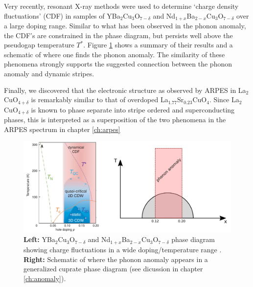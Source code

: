Very recently, resonant X-ray methods were used to determine `charge density fluctuations' (CDF) in samples of YBa$_2$Cu$_3$O$_{7-\delta}$ and Nd$_{1+x}$Ba$_{2-x}$Cu$_3$O$_{7-\delta}$ over a large doping range. Similar to what has been observed in the phonon anomaly, the CDF's are constrained in the phase diagram, but persists well above the pseudogap temperature $T^*$. Figure \ref{fig:cdw_summary} shows a summary of their results and a schematic of where one finds the phonon anomaly. The similarity of these phenomena strongly supports the suggested \cite{Reznik2012} connection between the phonon anomaly and dynamic stripes.

Finally, we discovered that the electronic structure as observed by ARPES in La$_2$CuO$_{4+\delta}$ is remarkably similar to that of overdoped La$_{1.77}$Sr$_{0.23}$CuO$_4$. Since La$_2$CuO$_{4+\delta}$ is known to phase separate into stripe ordered and superconducting phases, this is interpreted as a superposition of the two phenomena in the ARPES spectrum in chapter \ref{ch:arpes}

\begin{figure}
    \centering
    \includegraphics[width=\textwidth]{fig/conclusion/cdw_summary.png}
    \caption{\textbf{Left:} YBa$_2$Cu$_3$O$_{7-\delta}$ and Nd$_{1+x}$Ba$_{2-x}$Cu$_3$O$_{7-\delta}$ phase diagram showing charge fluctuations in a wide doping/temperature range \cite{Arpaia2019}. \textbf{Right:} Schematic of where the phonon anomaly appears in a generalized cuprate phase diagram (see dicussion in chapter \ref{ch:anomaly}).}
    \label{fig:cdw_summary}
\end{figure}


